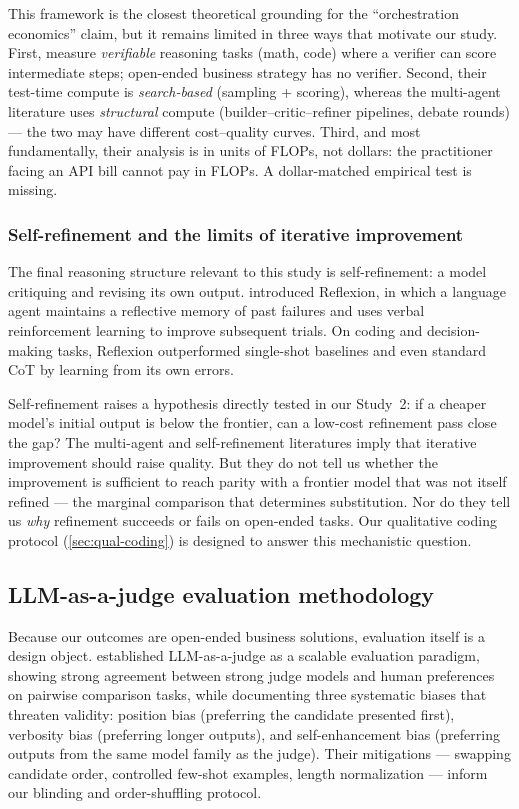 \documentclass[12pt,a4paper]{article}
\begin{document}
This framework is the closest theoretical grounding for the ``orchestration
economics'' claim, but it remains limited in three ways that motivate our study.
First, \citet{SnellEtAl2024} measure \emph{verifiable} reasoning tasks (math,
code) where a verifier can score intermediate steps; open-ended business
strategy has no verifier. Second, their test-time compute is
\emph{search-based} (sampling + scoring), whereas the multi-agent literature
uses \emph{structural} compute (builder--critic--refiner pipelines, debate
rounds) --- the two may have different cost--quality curves. Third, and most
fundamentally, their analysis is in units of FLOPs, not dollars: the
practitioner facing an API bill cannot pay in FLOPs. A dollar-matched empirical
test is missing.

\subsubsection{Self-refinement and the limits of iterative improvement}

The final reasoning structure relevant to this study is self-refinement: a
model critiquing and revising its own output. \citet{ShinnEtAl2023} introduced
Reflexion, in which a language agent maintains a reflective memory of past
failures and uses verbal reinforcement learning to improve subsequent trials.
On coding and decision-making tasks, Reflexion outperformed single-shot
baselines and even standard CoT by learning from its own errors.

Self-refinement raises a hypothesis directly tested in our Study~2: if a cheaper
model's initial output is below the frontier, can a low-cost refinement pass close
the gap? The multi-agent and self-refinement literatures imply that iterative
improvement should raise quality. But they do not tell us whether the
improvement is sufficient to reach parity with a frontier model that was not
itself refined --- the marginal comparison that determines substitution. Nor do
they tell us \emph{why} refinement succeeds or fails on open-ended tasks. Our
qualitative coding protocol (\cref{sec:qual-coding}) is designed to answer this
mechanistic question.

\subsection{LLM-as-a-judge evaluation methodology}

Because our outcomes are open-ended business solutions, evaluation itself is a
design object. \citet{ZhengEtAl2023} established LLM-as-a-judge as a scalable
evaluation paradigm, showing strong agreement between strong judge models and
human preferences on pairwise comparison tasks, while documenting three
systematic biases that threaten validity: position bias (preferring the
candidate presented first), verbosity bias (preferring longer outputs), and
self-enhancement bias (preferring outputs from the same model family as the
judge). Their mitigations --- swapping candidate order, controlled few-shot
examples, length normalization --- inform our blinding and order-shuffling
protocol.
\end{document}
